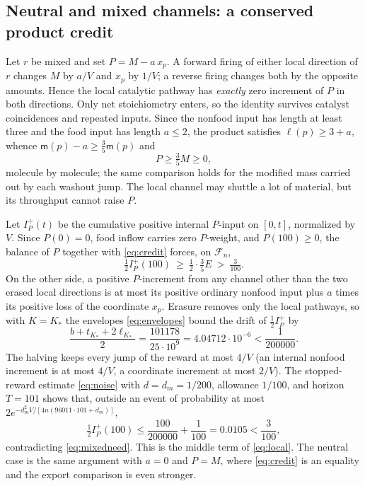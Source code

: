\documentclass[11pt,letterpaper]{article}
\theoremstyle{plain}
\theoremstyle{definition}
\theoremstyle{remark}
\numberwithin{equation}{section}
\newcommand{\cF}{\mathcal F}
\newcommand{\m}{\mathsf m}
\begin{document}
\subsection{Neutral and mixed channels: a conserved product credit}\label{sec:mixed}
Let $r$ be mixed and set $P=M-a\,x_p$. A forward firing of either local direction of $r$ changes $M$ by $a/V$ and $x_p$ by $1/V$; a reverse firing changes both by the opposite amounts. Hence the local catalytic pathway has \emph{exactly} zero increment of $P$ in both directions. Only net stoichiometry enters, so the identity survives catalyst coincidences and repeated inputs. Since the nonfood input has length at least three and the food input has length $a\le2$, the product satisfies $\ell(p)\ge3+a$, whence $\m(p)-a\ge\tfrac35\m(p)$ and
\begin{equation}\label{eq:credit}
 P\ge\tfrac35M\ge0 ,
\end{equation}
molecule by molecule; the same comparison holds for the modified mass carried out by each washout jump. The local channel may shuttle a lot of material, but its throughput cannot raise $P$.

Let $I_P^+(t)$ be the cumulative positive internal $P$-input on $[0,t]$, normalized by $V$. Since $P(0)=0$, food inflow carries zero $P$-weight, and $P(100)\ge0$, the balance of $P$ together with \eqref{eq:credit} forces, on $\cF_n$,
\begin{equation}\label{eq:mixedneed}
 \tfrac12I_P^+(100)\ \ge\ \tfrac12\cdot\tfrac35E\ >\ \tfrac3{100} .
\end{equation}
On the other side, a positive $P$-increment from any channel other than the two erased local directions is at most its positive ordinary nonfood input plus $a$ times its positive loss of the coordinate $x_p$. Erasure removes only the local pathways, so with $K=K_*$ the envelopes \eqref{eq:envelopes} bound the drift of $\tfrac12I_P^+$ by
\begin{equation}\label{eq:mixedbudget}
 \frac{b+t_{K_*}+2\ell_{K_*}}2=\frac{101178}{25\cdot10^9}=4.04712\cdot10^{-6}<\frac1{200000} .
\end{equation}
The halving keeps every jump of the reward at most $4/V$ (an internal nonfood increment is at most $4/V$, a coordinate increment at most $2/V$). The stopped-reward estimate \eqref{eq:noise} with $d=d_m=1/200$, allowance $1/100$, and horizon $T=101$ shows that, outside an event of probability at most $2e^{-d_m^2V/[4n(96011\cdot101+d_m)]}$,
\[
 \tfrac12I_P^+(100)\le\frac{100}{200000}+\frac1{100}=0.0105<\frac3{100},
\]
contradicting \eqref{eq:mixedneed}. This is the middle term of \eqref{eq:local}. The neutral case is the same argument with $a=0$ and $P=M$, where \eqref{eq:credit} is an equality and the export comparison is even stronger.
\end{document}
